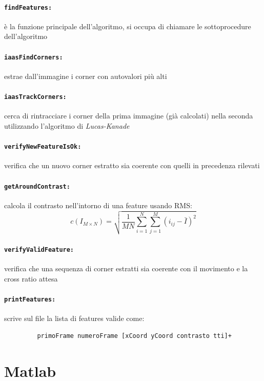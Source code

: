 \documentclass[12pt]{report}
\begin{document}
\paragraph*{\verb_findFeatures:_} \`e la funzione principale dell'algoritmo, si occupa di chiamare le sottoprocedure dell'algoritmo

\paragraph*{\verb_iaasFindCorners:_} estrae dall'immagine i corner con autovalori pi\`u alti

\paragraph*{\verb_iaasTrackCorners:_} cerca di rintracciare i corner della prima immagine (gi\`a calcolati) nella seconda utilizzando l'algoritmo di \emph{Lucas-Kanade}

\paragraph*{\verb_verifyNewFeatureIsOk:_} verifica che un nuovo corner estratto sia coerente con quelli in precedenza rilevati

\paragraph*{\verb_getAroundContrast:_} calcola il contrasto nell'intorno di una feature usando RMS: $$ c\left(I_{M\times N}\right) = \sqrt{\frac{1}{MN}\sum_{i=1}^N\sum_{j=1}^M(i_{ij}-\bar{I})^2} $$

\paragraph*{\verb_verifyValidFeature:_} verifica che una sequenza di corner estratti sia coerente con il movimento e la cross ratio attesa

\paragraph*{\verb_printFeatures:_} scrive sul file la lista di features valide come:
\begin{verbatim}
	     primoFrame numeroFrame [xCoord yCoord contrasto tti]+
\end{verbatim}


\section{Matlab}
\end{document}
